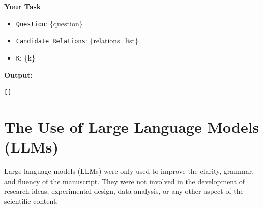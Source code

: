 \begin{tcolorbox}[title=Prompt Template for LLM-Guided Path Expansion, colback=white, colframe=black!75, boxrule=0.5pt, arc=2mm]
\textbf{Your Task}
\begin{itemize}[leftmargin=1.5em, itemsep=0pt, topsep=2pt]
    \item \texttt{Question}: \{question\}
    \item \texttt{Candidate Relations}: \{relations\_list\}
    \item \texttt{K}: \{k\}
\end{itemize}

\textbf{Output:}
\begin{verbatim}
[]
\end{verbatim}
\end{tcolorbox}
\label{fig:prompt_llm_planner}


\section{The Use of Large Language Models (LLMs)}

Large language models (LLMs) were only used to improve the clarity, grammar, and fluency of the manuscript. They were not involved in the development of research ideas, experimental design, data analysis, or any other aspect of the scientific content.